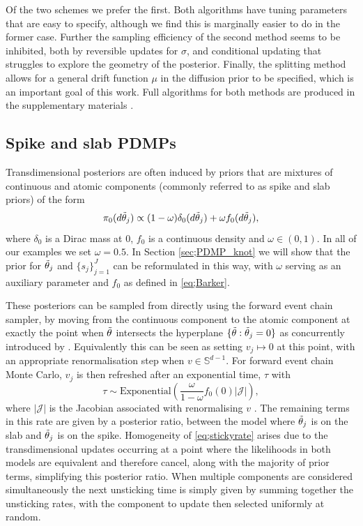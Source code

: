 \documentclass[ba,preprint]{imsart}
\theoremstyle{plain}
\theoremstyle{definition}
\theoremstyle{remark}
\begin{document}
Of the two schemes we prefer the first. Both algorithms have tuning parameters that are easy to specify, although we find this is marginally easier to do in the former case. Further the sampling efficiency of the second method seems to be inhibited, both by reversible updates for $\sigma$, and conditional updating that struggles to explore the geometry of the posterior. Finally, the splitting method allows for a general drift function $\mu$ in the diffusion prior to be specified, which is an important goal of this work. Full algorithms for both methods are produced in the supplementary materials \citep[{\color{red}Section 2.1}]{Hardcastle2024supp}.

\subsection{Spike and slab PDMPs}
\label{sec;SMPDMP}

Transdimensional posteriors are often induced by priors that are mixtures of continuous and atomic components (commonly referred to as spike and slab priors) of the form
\begin{equation}
    \label{eq;SnS}
    \pi_0(d\Tilde{\theta}_j) \propto (1-\omega)\delta_0(d\Tilde{\theta}_j) + \omega f_0(d\Tilde{\theta}_j),
\end{equation}
where $\delta_0$ is a Dirac mass at 0, $f_0$ is a continuous density and $\omega \in (0,1)$.  In all of our examples we set $\omega = 0.5$. In Section \ref{sec;PDMP_knot} we will show that the prior for $\Tilde{\theta}_j$ and $\{s_j\}_{j=1}^J$ can be reformulated in this way, with $\omega$ serving as an auxiliary parameter and $f_0$ as defined in \eqref{eq;Barker}.

These posteriors can be sampled from directly using the forward event chain sampler, by moving from the continuous component to the atomic component at exactly the point when $\Tilde{\theta}$ intersects the hyperplane $\{\Tilde{\theta} : \Tilde{\theta}_j 
 = 0\}$ {\color{red}as concurrently introduced by} \cite{Bierkens2023a,Chevallier2023}. Equivalently this can be seen as setting $v_j \mapsto 0$ at this point, with an appropriate renormalisation step when $v \in \mathbb{S}^{d-1}$. For forward event chain Monte Carlo, $v_j$ is then refreshed after an exponential time, $\tau$ with 
 \begin{equation}
    \label{eq;stickyrate}
     \tau \sim \text{Exponential}\left(\frac{\omega}{1-\omega}f_0(0)|\mathcal{J}|\right),
 \end{equation}
 where $|\mathcal{J}|$ is the Jacobian associated with renormalising $v$ \cite[Proposition 1;][]{Chevallier2023}. The remaining terms in this rate are given by a posterior ratio, between the model where $\Tilde{\theta}_j$ is on the slab and $\Tilde{\theta}_j$ is on the spike. Homogeneity of \eqref{eq;stickyrate} arises due to the transdimensional updates occurring at a point where the likelihoods in both models are equivalent and therefore cancel, along with the majority of prior terms, simplifying this posterior ratio. When multiple components are considered simultaneously the next unsticking time is simply given by summing together the unsticking rates, with the component to update then selected uniformly at random.
 
\end{document}
